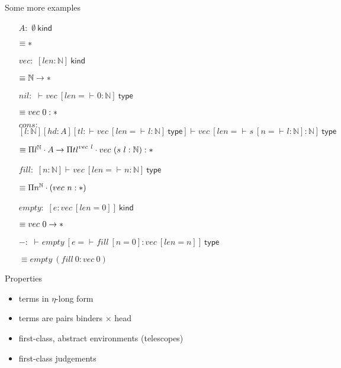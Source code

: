\documentclass[ignorenonframetext,red]{beamer}
\newcommand\postbinder{\cdot}
\newcommand\prd[2]{\ensuremath\Pi{#1}^{#2}\postbinder}
\newcommand\app[1]{{#1}\ }
\newcommand\srt[1]{\ensuremath\mathsf{#1}}
\newcommand\type{\srt *}
\newcommand\eent[1]{\left[{#1}\right]}
\newcommand\econs[2]{{#1}\eent{#2}}
\newcommand\esing[1]{\econs{}{#1}}
\newcommand\jlangt[4]{{#2}\vdash_{\mathrm{#1}}{#3}:{#4}}
\newcommand\jlangA[3]{{#2}\vdash_{\mathrm{#1}}{#3}\mathsf{\ type}}
\newcommand\jlangK[3]{{#2}\vdash_{\mathrm{#1}}{#3}\mathsf{\ kind}}
\newcommand\jnlft[3]{\jlangt{}{#1}{#2}{#3}}
\newcommand\jnlfA[2]{\jlangA{}{#1}{#2}}
\newcommand\jnlfK[1]{{#1}\ \mathsf{kind}} %
\newcommand\nat{\mathbb N}
\newenvironment{smallright}{
  \begin{flushright}
    \footnotesize
  }{
  \end{flushright}
}
\begin{document}
\begin{frame}{Some more examples}
  \begin{enumerate}
  \item[$A:$] $\jnlfK\emptyset$
    \begin{smallright}
      $\equiv \type$
    \end{smallright}
  \item[$vec:$]
    $\jnlfK{\esing{len:\nat}}$
    \begin{smallright}
      $\equiv \nat\to\type$
    \end{smallright}
  \item[$nil:$]
    $\jnlfA{}{\app{vec}\esing{len=\jnlft{}{0}{\nat}}}$
    \begin{smallright}
      \footnotesize $\equiv \app{vec} 0 : \type$
    \end{smallright}
  \item[$cons:$]
    $\jnlfA { \econs{ \econs{ \esing{l:\nat}} {hd:A}}
      {tl:\jnlfA{}{ \app {vec} {\esing{len=\jnlft{}{l}{\nat}}}}}}
    {\app{vec} {\esing{len =\jnlft{}{\app s {\esing{n =
                \jnlft{}{l}{\nat}}}}{\nat}}}}$
    \begin{smallright}
      $\equiv \prd l \nat A\to \prd {tl} {\app {vec} l}
      \app {vec} (\app s l : \nat) : \type$
    \end{smallright}
  \item[$fill:$]
    $\jnlfA{\esing{n:\nat}}{\app{vec}{\esing{len=\jnlft{}{n}{\nat}}}}$
    \begin{smallright}
      $\equiv \prd n \nat (\app{vec} n : \type)$
    \end{smallright}
  \item[$empty:$]
    $\jnlfK{\esing{e:\app{vec}\esing{len=0}}}$
    \begin{smallright}
      $\equiv \app{vec} 0\to \type$
    \end{smallright}
  \item[$-:$]
    $\jnlfA{}{\app{empty}\esing{e=\jnlft{}{\app{fill}\esing{n=0}}{\app{vec}\esing{len=n}}}}$
    \begin{smallright}
      $\equiv \app{empty}(\app{fill} 0 : \app{vec} 0)$
    \end{smallright}
  \end{enumerate}
\end{frame}

\begin{frame}{Properties}
  \begin{itemize}
  \item terms in $\eta$-long form
  \item terms are pairs binders $\times$ head
  \item first-class, abstract environments (telescopes)
  \item first-class judgements
  \end{itemize}
\end{frame}
\end{document}
